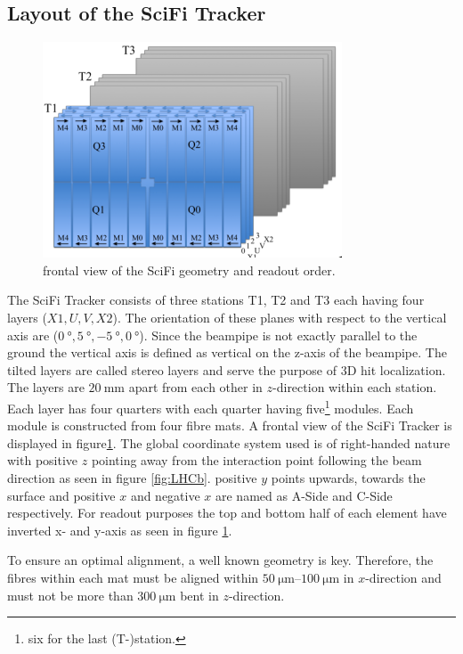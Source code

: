 \subsection{Layout of the SciFi Tracker}

\begin{figure}
  \centering
  \includegraphics{plots/SciFi_Tracker.png}
  \caption{frontal view of the SciFi geometry and readout order\cite{scifiupdate20210311}.}
  \label{fig:scifi}
\end{figure}

The SciFi Tracker consists of three stations T1, T2 and T3 each having four layers ($X1, U, V, X2$). The orientation of these planes with respect to the vertical axis are ($\SI{0}{\degree}, \SI{+5}{\degree}, \SI{-5}{\degree}, \SI{0}{\degree}$).
Since the beampipe is not exactly parallel to the ground the vertical axis is
defined as vertical on the z-axis of the beampipe.
The tilted layers are called stereo layers and serve the purpose of 3D hit localization.
The layers are $\SI{20}{\milli\metre}$ apart from each other in $z$-direction within each station.
Each layer has four quarters with each quarter having five\footnote{six for the last (T-)station.} modules. Each module is constructed from four fibre mats.
A frontal view of the SciFi Tracker is displayed in figure\ref{fig:scifi}.
The global coordinate system used is of right-handed nature with positive $z$ pointing away from the interaction point following the beam direction as seen in figure \ref{fig:LHCb}. positive $y$ points upwards, towards the surface and positive $x$ and negative $x$ are named as A-Side and C-Side respectively\cite{scifiInfo}.
For readout purposes the top and bottom half of each element have inverted x- and y-axis as seen in figure \ref{fig:scifi}.

To ensure an optimal alignment, a well known geometry is key. Therefore, the
fibres within each mat must be aligned within $\SIrange{50}{100}{\micro\metre}$ in $x$-direction and must not be more than $\SI{300}{\micro\metre}$ bent in $z$-direction.

